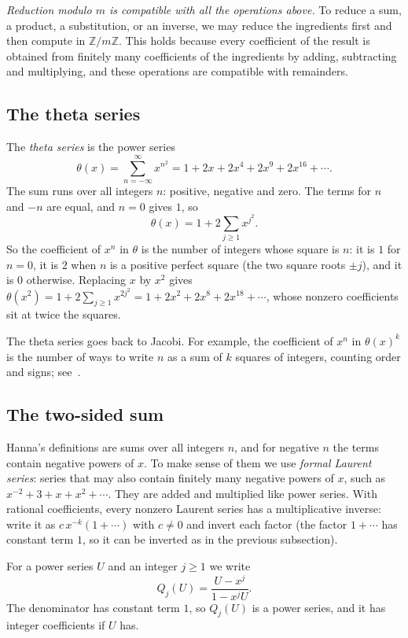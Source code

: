 \documentclass[11pt,a4paper]{article}
\theoremstyle{definition}
\theoremstyle{remark}
\newcommand{\Z}{\mathbb{Z}}
\begin{document}
\emph{Reduction modulo $m$ is compatible with all the operations above.} To reduce a sum, a product, a substitution, or
an inverse, we may reduce the ingredients first and then compute in $\Z/m\Z$. This holds because every
coefficient of the result is obtained from finitely many coefficients of the ingredients by adding, subtracting and
multiplying, and these operations are compatible with remainders.

\subsection{The theta series}
The \emph{theta series} is the power series
\[
\theta(x)=\sum_{n=-\infty}^{\infty}x^{n^2}=1+2x+2x^4+2x^9+2x^{16}+\cdots .
\]
The sum runs over all integers $n$: positive, negative and zero. The terms for $n$ and $-n$ are equal, and $n=0$
gives $1$, so
\[
\theta(x)=1+2\sum_{j\ge1}x^{j^2}.
\]
So the coefficient of $x^n$ in $\theta$ is the number of integers whose square is $n$: it is $1$ for $n=0$, it is $2$
when $n$ is a positive perfect square (the two square roots $\pm j$), and it is $0$ otherwise. Replacing $x$ by $x^2$
gives $\theta(x^2)=1+2\sum_{j\ge1}x^{2j^2}=1+2x^2+2x^8+2x^{18}+\cdots$, whose nonzero coefficients sit at twice the
squares.

The theta series goes back to Jacobi. For example, the
coefficient of $x^n$ in $\theta(x)^k$ is the number of ways to write $n$ as a sum of $k$ squares of integers,
counting order and signs; see~\cite{grosswald}.

\subsection{The two-sided sum}\label{sec:fold}
Hanna's definitions are sums over all integers $n$, and for negative $n$ the terms contain negative powers of $x$. To
make sense of them we use \emph{formal Laurent series}: series that may also contain finitely many negative powers of
$x$, such as $x^{-2}+3+x+x^2+\cdots$. They are added and multiplied like power series. With rational coefficients,
every nonzero Laurent series has a multiplicative inverse: write it as $c\,x^{-k}(1+\cdots)$ with $c\ne0$ and invert
each factor (the factor $1+\cdots$ has constant term $1$, so it can be inverted as in the previous subsection).

For a power series $U$ and an integer $j\ge1$ we write
\[
Q_j(U)=\frac{U-x^j}{1-x^jU}.
\]
The denominator has constant term $1$, so $Q_j(U)$ is a power series, and it has integer coefficients if $U$
has.
\end{document}
